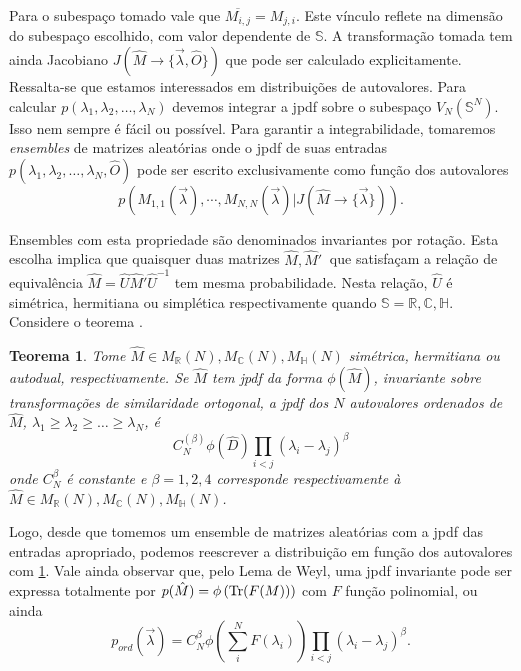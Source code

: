 \documentclass[11pt,twocolumn]{article}
\newcommand{\matriz}[1]{\hat#1}
\newcommand{\mmany}[2]{ #1_1, #1_2, \dots, #1_#2 }
\newcommand{\mcmany}[3]{#1_1 #3 #1_2 #3 \dots #3 #1_#2}
\newcommand{\cjgt}[1]{\overline{#1}}
\newcommand{\C}{\mathbb{C}}
\newcommand{\R}{\mathbb{R}}
\newcommand{\J}{J} %
\newcommand{\p}{p} %
\newcommand{\Se}{\mathbb{S}}
\newcommand{\He}{\mathbb{H}}
\newtheorem{thm}[lemma]{Teorema}
\numberwithin{equation}{section} %
\begin{document}
Para o subespaço tomado vale que $\cjgt{M_{i,j}} = M_{j, i}$. Este vínculo reflete na dimensão do subespaço escolhido, com valor dependente de $\Se$. A transformação tomada tem ainda Jacobiano $\J(\matriz{M} \rightarrow \{ \vec{\lambda}, \matriz{O} \} )$ que pode ser calculado explicitamente. Ressalta-se que estamos interessados em distribuições de autovalores. Para calcular $\p(\mmany{\lambda}{N})$ devemos integrar a jpdf sobre o subespaço $V_N(\Se^N)$. Isso nem sempre é fácil ou possível. Para garantir a integrabilidade, tomaremos \textit{ensembles} de matrizes aleatórias onde o jpdf de suas entradas $\p(\mmany{\lambda}{N}, \matriz{O})$ pode ser escrito exclusivamente como função dos autovalores $$\p \left( M_{1,1}(\vec{\lambda}), \cdots, M_{N,N}(\vec{\lambda}) | \J(\matriz{M} \rightarrow \{ \vec{\lambda} \} ) \right).$$

Ensembles com esta propriedade são denominados invariantes por rotação. Esta escolha implica que quaisquer duas matrizes $\matriz{M}, \matriz{M'~}$ que satisfaçam a relação de equivalência $\matriz{M} = \matriz{U} \matriz{M'} \matriz{U}^{-1}$ tem mesma probabilidade. Nesta relação, $\matriz{U}$ é simétrica, hermitiana ou simplética respectivamente quando $\Se = \R,\C,\He $. Considere o teorema \cite[Capítulo~3]{AlanThesis}.
\begin{thm}
	Tome $\matriz{M} \in M_{\R}(N),  M_{\C}(N),  M_{\He}(N)$ simétrica, hermitiana ou autodual, respectivamente. Se  $\matriz{M}$ tem jpdf da forma $\phi(\matriz{M})$, invariante sobre transformações de similaridade ortogonal, a jpdf dos $N$ autovalores ordenados de $\matriz{M}$, $\mcmany{\lambda}{N}{\geq}$, é $$ C_{N}^{(\beta)} \phi(\matriz{D}) \prod_{i < j} (\lambda_i - \lambda_j)^{\beta}$$ onde $C_{N}^{\beta}$ é constante e $\beta = 1, 2, 4$ corresponde respectivamente à $\matriz{M} \in M_{\R}(N),  M_{\C}(N),  M_{\He}(N)$. 
	\label{Teorema: Invariante}
\end{thm}

Logo, desde que tomemos um ensemble de matrizes aleatórias com a jpdf das entradas apropriado, podemos reescrever a distribuição em função dos autovalores com \ref{Teorema: Invariante}. Vale ainda observar que, pelo Lema de Weyl, uma jpdf invariante pode ser expressa totalmente por $\p(\matriz{M})= \phi \left(\Tr(F(M)) \right)$ com $F$ função polinomial, ou ainda
\begin{equation}
	\p_{ord}(\vec{\lambda}) = C_{N}^{\beta} \phi{\left( \sum_i^N F(\lambda_i) \right)} \prod_{i < j} (\lambda_i - \lambda_j)^{\beta}.
	\label{Equation: p-ord}
\end{equation}
\end{document}
